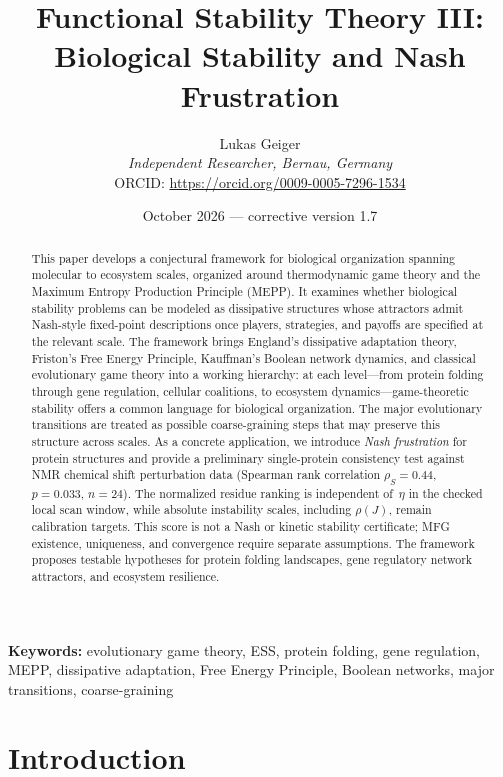 \documentclass[12pt,a4paper]{article}
\title{Functional Stability Theory III: Biological Stability and Nash Frustration}
\author{Lukas Geiger\\
\textit{Independent Researcher, Bernau, Germany}\\
ORCID: \url{https://orcid.org/0009-0005-7296-1534}}
\date{October 2026 --- corrective version 1.7}
\theoremstyle{remark}
\begin{document}
\maketitle
\begin{abstract}
This paper develops a conjectural framework for biological organization spanning molecular to ecosystem scales, organized around thermodynamic game theory and the Maximum Entropy Production Principle (MEPP). It examines whether biological stability problems can be modeled as dissipative structures whose attractors admit Nash-style fixed-point descriptions once players, strategies, and payoffs are specified at the relevant scale. The framework brings England's dissipative adaptation theory, Friston's Free Energy Principle, Kauffman's Boolean network dynamics, and classical evolutionary game theory into a working hierarchy: at each level---from protein folding through gene regulation, cellular coalitions, to ecosystem dynamics---game-theoretic stability offers a common language for biological organization. The major evolutionary transitions are treated as possible coarse-graining steps that may preserve this structure across scales. As a concrete application, we introduce \emph{Nash frustration} for protein structures and provide a preliminary single-protein consistency test against NMR chemical shift perturbation data (Spearman rank correlation $\rho_S = 0.44$, $p = 0.033$, $n = 24$). The normalized residue ranking is independent of~$\eta$ in the checked local scan window, while absolute instability scales, including $\rho(J)$, remain calibration targets. This score is not a Nash or kinetic stability certificate; MFG existence, uniqueness, and convergence require separate assumptions. The framework proposes testable hypotheses for protein folding landscapes, gene regulatory network attractors, and ecosystem resilience.
\end{abstract}

\textbf{Keywords:} evolutionary game theory, ESS, protein folding, gene regulation, MEPP, dissipative adaptation, Free Energy Principle, Boolean networks, major transitions, coarse-graining

\clearpage
\tableofcontents
\clearpage

\section{Introduction}
\label{sec:introduction}
\end{document}
